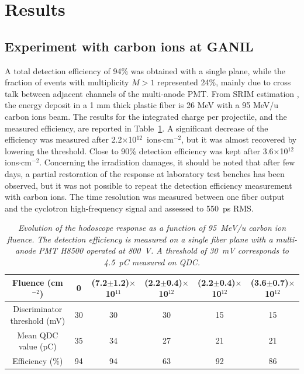 \documentclass[a4paper,11pt]{article}
\begin{document}
\section{Results}
\label{Results}
\subsection{Experiment with carbon ions at GANIL}
A total detection efficiency of 94\% was obtained with a single plane, while the fraction of events with multiplicity $M>1$ represented 24\%, mainly due to cross talk between adjacent channels of the multi-anode PMT.
From SRIM estimation \cite{Ziegler2010}, the energy deposit in a 1 mm thick plastic fiber is 26 MeV with a 95 MeV/u carbon ions beam. The results for the integrated charge per projectile, and the measured efficiency, are reported in Table~\ref{tab:GANIL}. A significant decrease of the efficiency was measured after 2.2$\times$10$^{12}$~ions$\cdot$cm$^{-2}$, but it was almost recovered by lowering the threshold. 
Close to 90\% detection efficiency was kept after 3.6$\times$10$^{12}$ ions$\cdot$cm$^{-2}$.
Concerning the irradiation damages, it should be noted that after few days, a partial restoration of the response at laboratory test benches has been observed, but it was not possible to repeat the detection efficiency measurement with carbon ions. 
The time resolution was measured between one fiber output and the cyclotron high-frequency signal and assessed to 550~ps RMS. 
\begin{table}[htb]
\caption{\small{\textit{Evolution of the hodoscope response as a function of 95~MeV/u carbon ion fluence. The detection efficiency is measured on a single fiber plane with a multi-anode PMT H8500 operated at 800~V. A threshold of 30~mV corresponds to 4.5~pC measured on QDC.}}}
\centering
\begin{tabular}{|c|c|c|c|c|c|}
\hline
Fluence (cm$^{-2}$)& 0 & (7.2$\pm$1.2)$\times$10$^{11}$ & (2.2$\pm$0.4)$\times$10$^{12}$ & (2.2$\pm$0.4)$\times$10$^{12}$ & (3.6$\pm$0.7)$\times$10$^{12}$\\
\hline
\makecell{Discriminator\\threshold (mV)} & 30 & 30 & 30 & 15 & 15\\
\hline
\makecell{Mean QDC\\value (pC)} & 35 & 34 & 27 & 21 & 21\\
\hline
Efficiency (\%) & 94 & 94 & 63 & 92 & 86\\
\hline
\end{tabular}
\label{tab:GANIL}
\end{table}
\end{document}

